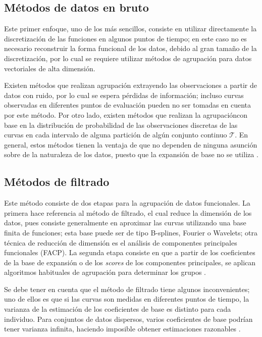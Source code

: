 \documentclass[
]{book}
\begin{document}
\hypertarget{muxe9todos-de-datos-en-bruto}{%
\subsection{Métodos de datos en bruto}\label{muxe9todos-de-datos-en-bruto}}

Este primer enfoque, uno de los más sencillos, consiste en utilizar directamente la discretización de las funciones en algunos puntos de tiempo; en este caso no es necesario reconstruir la forma funcional de los datos, debido al gran tamaño de la discretización, por lo cual se requiere utilizar métodos de agrupación para datos vectoriales de alta dimensión.

Existen métodos que realizan agrupación extrayendo las observaciones a partir de datos con ruido, por lo cual se espera pérdidas de información; incluso curvas observadas en diferentes puntos de evaluación pueden no ser tomadas en cuenta por este método. Por otro lado, existen métodos que realizan la agrupacióncon base en la distribución de probabilidad de las observaciones discretas de las curvas en cada intervalo de alguna partición de algún conjunto continuo \(\mathcal{T}\). En general, estos métodos tienen la ventaja de que no dependen de ninguna asunción sobre de la naturaleza de los datos, puesto que la expansión de base no se utiliza \citep{Jaque}.

\hypertarget{muxe9todos-de-filtrado}{%
\subsection{Métodos de filtrado}\label{muxe9todos-de-filtrado}}

Este método consiste de dos etapas para la agrupación de datos funcionales. La primera hace referencia al método de filtrado, el cual reduce la dimensión de los datos, pues consiste generalmente en aproximar las curvas utilizando una base finita de funciones; esta base puede ser de tipo B-splines, Fourier o Wavelets; otra técnica de reducción de dimensión es el análisis de componentes principales funcionales (FACP). La segunda etapa consiste en que a partir de los coeficientes de la base de expansión o de los \emph{scores} de los componentes principales, se aplican algoritmos habituales de agrupación para determinar los grupos \citep{Jaque}.

Se debe tener en cuenta que el método de filtrado tiene algunos inconvenientes; uno de ellos es que si las curvas son medidas en diferentes puntos de tiempo, la varianza de la estimación de los coeficientes de base es distinto para cada individuo. Para conjuntos de datos dispersos, varios coeficientes de base podrían tener varianza infinita, haciendo imposible obtener estimaciones razonables \citep{sugar}.
\end{document}
